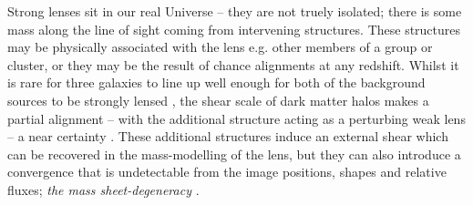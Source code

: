 \documentclass[useAMS,usenatbib]{mn2e}
\begin{document}

Strong lenses sit in our real Universe -- they are not truely isolated;
there is some mass along the line of sight coming from intervening structures.
These structures may be physically associated with the lens e.g. other members
of a group or cluster, or they may be the result of chance alignments at any redshift. 
Whilst it is rare for three galaxies to line up well enough for both of the background sources
to be strongly lensed \citep{GavazziEtal2008,CollettEtal2012a}, the shear scale of dark matter halos
makes a partial alignment -- with the additional structure acting as a perturbing weak lens -- 
a near certainty \citep{Vale+White2003,HilbertEtal2007}. These additional
structures induce an external shear which can be recovered in the mass-modelling
of the lens, but they can also introduce a convergence that
is undetectable from the image positions, shapes and relative fluxes; {\it the
mass sheet-degeneracy} \citep{FalcoEtal1985}.
\end{document}
